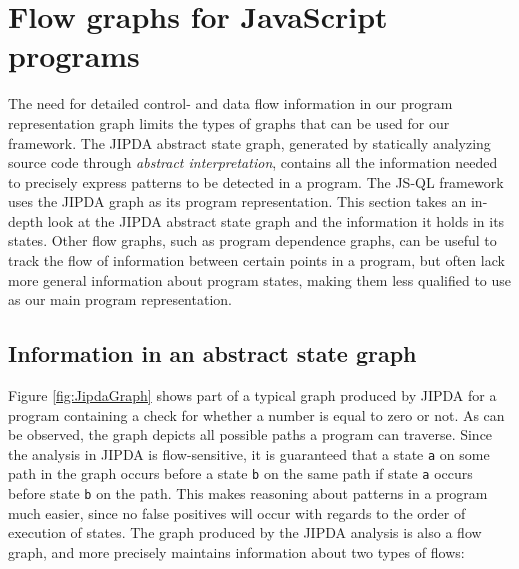 \section{Flow graphs for JavaScript programs}
\label{sec:FlowGraphs}
The need for detailed control- and data flow information in our program representation graph limits the types of graphs that can be used for our framework. The JIPDA\cite{functionPurity} abstract state graph, generated by statically analyzing source code through \textit{abstract interpretation}, contains all the information needed to precisely express patterns to be detected in a program. The JS-QL framework uses the JIPDA graph as its program representation. This section takes an in-depth look at the JIPDA abstract state graph and the information it holds in its states. Other flow graphs, such as program dependence graphs\cite{PDG}, can be useful to track the flow of information between certain points in a program, but often lack more general information about program states, making them less qualified to use as our main program representation.

\subsection{Information in an abstract state graph}

Figure \ref{fig:JipdaGraph} shows part of a typical graph produced by JIPDA for a program containing a check for whether a number is equal to zero or not. As can be observed, the graph depicts all possible paths a program can traverse. Since the analysis in JIPDA is flow-sensitive, it is guaranteed that a state \texttt{a} on some path in the graph occurs before a state \texttt{b} on the same path if state \texttt{a} occurs before state \texttt{b} on the path. This makes reasoning about patterns in a program much easier, since no false positives will occur with regards to the order of execution of states. The graph produced by the JIPDA analysis is also a flow graph, and more precisely maintains information about two types of flows:

